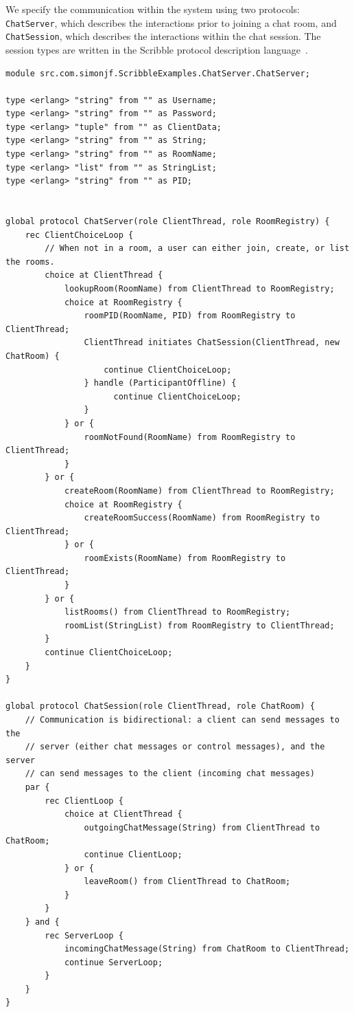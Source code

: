 \documentclass[a4paper]{article}
\begin{document}
We specify the communication within the system using two protocols: \texttt{ChatServer}, which describes the interactions prior to joining a chat room, and \texttt{ChatSession}, which describes the interactions within the chat session. The session types are written in the Scribble protocol description language~\cite{honda:scribble,scribblespec}.

\begin{minipage}{\linewidth}
\begin{lstlisting}[language=scribble]
module src.com.simonjf.ScribbleExamples.ChatServer.ChatServer;

type <erlang> "string" from "" as Username;
type <erlang> "string" from "" as Password;
type <erlang> "tuple" from "" as ClientData;
type <erlang> "string" from "" as String;
type <erlang> "string" from "" as RoomName;
type <erlang> "list" from "" as StringList;
type <erlang> "string" from "" as PID;


global protocol ChatServer(role ClientThread, role RoomRegistry) {
    rec ClientChoiceLoop {
        // When not in a room, a user can either join, create, or list the rooms.
        choice at ClientThread {
            lookupRoom(RoomName) from ClientThread to RoomRegistry;
            choice at RoomRegistry {
                roomPID(RoomName, PID) from RoomRegistry to ClientThread;
                ClientThread initiates ChatSession(ClientThread, new ChatRoom) {
                    continue ClientChoiceLoop;
                } handle (ParticipantOffline) {
                      continue ClientChoiceLoop;
                }
            } or {
                roomNotFound(RoomName) from RoomRegistry to ClientThread;
            }
        } or {
            createRoom(RoomName) from ClientThread to RoomRegistry;
            choice at RoomRegistry {
                createRoomSuccess(RoomName) from RoomRegistry to ClientThread;
            } or {
                roomExists(RoomName) from RoomRegistry to ClientThread;
            }
        } or {
            listRooms() from ClientThread to RoomRegistry;
            roomList(StringList) from RoomRegistry to ClientThread;
        }
        continue ClientChoiceLoop;
    }
}

global protocol ChatSession(role ClientThread, role ChatRoom) {
    // Communication is bidirectional: a client can send messages to the
    // server (either chat messages or control messages), and the server
    // can send messages to the client (incoming chat messages)
    par {
        rec ClientLoop {
            choice at ClientThread {
                outgoingChatMessage(String) from ClientThread to ChatRoom;
                continue ClientLoop;
            } or {
                leaveRoom() from ClientThread to ChatRoom;
            }
        }
    } and {
        rec ServerLoop {
            incomingChatMessage(String) from ChatRoom to ClientThread;
            continue ServerLoop;
        }
    }
}
\end{lstlisting}
\end{minipage}
\end{document}
